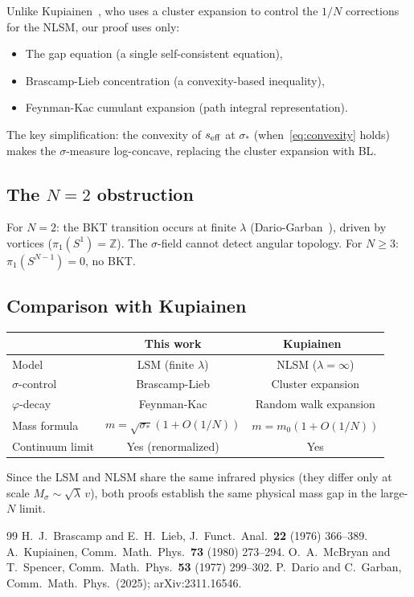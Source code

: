 \documentclass[12pt]{article}
\theoremstyle{definition}
\theoremstyle{remark}
\newcommand{\Z}{\mathbb{Z}}
\newcommand{\ph}{\varphi}
\begin{document}
Unlike Kupiainen~\cite{Kupiainen80}, who uses a cluster expansion to
control the $1/N$ corrections for the NLSM, our proof uses only:
\begin{itemize}
\item The gap equation (a single self-consistent equation),
\item Brascamp-Lieb concentration (a convexity-based inequality),
\item Feynman-Kac cumulant expansion (path integral representation).
\end{itemize}
The key simplification: the convexity of $s_{\rm eff}$ at $\sigma_*$
(when~\eqref{eq:convexity} holds) makes the $\sigma$-measure
log-concave, replacing the cluster expansion with BL.

\subsection{The $N = 2$ obstruction}

For $N = 2$: the BKT transition occurs at finite $\lambda$
(Dario-Garban~\cite{DG25}), driven by vortices
($\pi_1(S^1) = \Z$). The $\sigma$-field cannot detect angular
topology. For $N \ge 3$: $\pi_1(S^{N-1}) = 0$, no BKT.

\subsection{Comparison with Kupiainen}

\begin{center}
\begin{tabular}{|l|c|c|}
\hline
& This work & Kupiainen~\cite{Kupiainen80} \\
\hline
Model & LSM (finite $\lambda$) & NLSM ($\lambda = \infty$) \\
$\sigma$-control & Brascamp-Lieb & Cluster expansion \\
$\ph$-decay & Feynman-Kac & Random walk expansion \\
Mass formula & $m = \sqrt{\sigma_*}(1+O(1/N))$ & $m = m_0(1+O(1/N))$ \\
Continuum limit & Yes (renormalized) & Yes \\
\hline
\end{tabular}
\end{center}

Since the LSM and NLSM share the same infrared physics (they differ
only at scale $M_\sigma \sim \sqrt{\lambda}\,v$), both proofs
establish the same physical mass gap in the large-$N$ limit.

\begin{thebibliography}{99}
 H.~J.~Brascamp and E.~H.~Lieb,
  J.~Funct.~Anal.~\textbf{22} (1976) 366--389.
 A.~Kupiainen,
  Comm.~Math.~Phys.~\textbf{73} (1980) 273--294.
 O.~A.~McBryan and T.~Spencer,
  Comm.~Math.~Phys.~\textbf{53} (1977) 299--302.
 P.~Dario and C.~Garban,
  Comm.~Math.~Phys.~(2025); arXiv:2311.16546.
\end{thebibliography}
\end{document}
